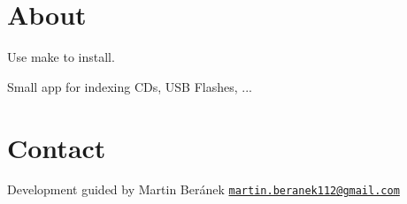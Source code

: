 \hypertarget{index_About}{}\section{About}\label{index_About}
Use make to install.

Small app for indexing C\-Ds, U\-S\-B Flashes, ...\hypertarget{index_Contact}{}\section{Contact}\label{index_Contact}
Development guided by Martin Beránek \href{mailto:martin.beranek112@gmail.com}{\tt martin.\-beranek112@gmail.\-com} 